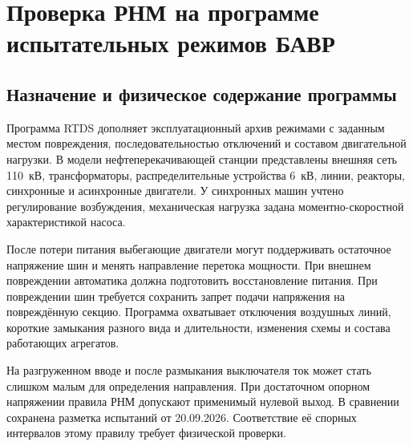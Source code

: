 \section{Проверка РНМ на программе испытательных режимов БАВР}
\label{sec:ch5_rtds_validation}

\subsection{Назначение и физическое содержание программы}

Программа RTDS дополняет эксплуатационный архив режимами с заданным местом повреждения,
последовательностью отключений и составом двигательной нагрузки. В модели
нефтеперекачивающей станции представлены внешняя сеть 110~кВ, трансформаторы,
распределительные устройства 6~кВ, линии, реакторы, синхронные и асинхронные двигатели.
У синхронных машин учтено регулирование возбуждения, механическая нагрузка задана
моментно-скоростной характеристикой насоса.

После потери питания выбегающие двигатели могут поддерживать остаточное напряжение шин и
менять направление перетока мощности. При внешнем повреждении автоматика должна
подготовить восстановление питания. При повреждении шин требуется сохранить запрет
подачи напряжения на повреждённую секцию. Программа охватывает отключения воздушных
линий, короткие замыкания разного вида и длительности, изменения схемы и состава
работающих агрегатов.

На разгруженном вводе и после размыкания выключателя ток может стать слишком малым для
определения направления. При достаточном опорном напряжении правила РНМ допускают
применимый нулевой выход. В сравнении сохранена разметка испытаний от 20.09.2026.
Соответствие её спорных интервалов этому правилу требует физической проверки.

